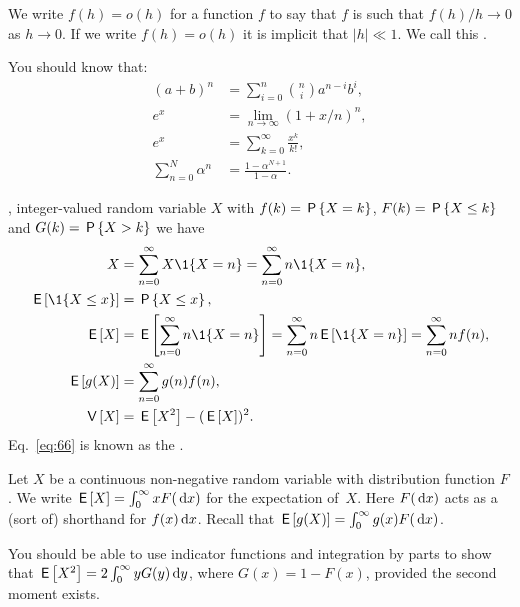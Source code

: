 \documentclass[queueing_book]{subfiles}
\begin{document}
We write $f(h)=o(h)$ for a function $f$ to say that $f$ is such that $f(h)/h \to 0$ as $h\to 0$.
If we write $f(h) = o(h)$ it is implicit that $|h| \ll 1$.
We call this .


You should know that:
\begin{subequations}
 \begin{align}
 (a+b)^n &= \sum_{i=0}^n {n \choose i} a^{n-i} b^i, \label{eq:71}\\
e^x &= \lim_{n\to\infty} (1+x/n)^n, \label{eq:65}\\
 e^x &= \sum_{k=0}^{\infty} \frac{x^k}{k!}, \label{eq:76}\\
 \sum_{n=0}^N \alpha^n &= \frac{1-\alpha^{N+1}}{1-\alpha}. \label{eq:61}
\end{align}
\end{subequations}

, integer-valued random variable $X$ with  $f(k)= \P{X = k}$, 
 $F(k)=\P{X\leq k}$ and  $G(k) = \P{X>k}$ we have
\begin{subequations}\label{eq:105}
\begin{align}
X&=\sum_{n=0}^\infty X\1{X=n} = \sum_{n=0}^\infty n \1{X=n}, \label{eq:77} \\
\E{\1{X\leq x}} &= \P{X\leq x}, \label{eq:74}\\
\E X &= \E{\sum_{n=0}^\infty n \1{X=n}} = \sum_{n=0}^\infty n \E{\1{X=n}} = \sum_{n=0}^\infty n f(n), \label{eq:p-78} \\
  \E{g(X)} &= \sum_{n=0}^\infty g(n) f(n), \label{eq:66} \\
  \V X &= \E{X^2} - (\E X)^2.\label{eq:68}\\
\end{align}             
\end{subequations}
Eq.~\cref{eq:66} is known as the .


Let $X$ be a continuous non-negative random variable with distribution function $F$.
We write $ \E{X} = \int_0^\infty x F(\d x)$ for the expectation of~$X$.
Here $F(\d x)$ acts as a (sort of) shorthand for $f(x) \d x$.
Recall that $\E{g(X)} = \int_0^\infty g(x) F(\d x)$.

You should be able to use indicator functions and integration by parts to show that $\E{X^2} = 2\int_0^\infty y G(y) \d y$, where $G(x) = 1- F(x)$, provided the second moment exists.
\end{document}

